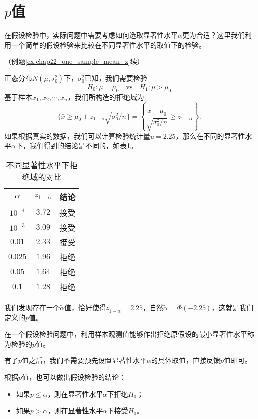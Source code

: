 \section{$p$值}
在假设检验中，实际问题中需要考虑如何选取显著性水平$\alpha$更为合适？这里我们利用一个简单的假设检验来比较在不同显著性水平的取值下的检验。

\begin{example}{（例题\ref{ex:chap22_one_sample_mean_z}续）}

    正态分布$N(\mu,\sigma_0^2)$下，$\sigma_0^2$已知，我们需要检验$$
    H_0: \mu = \mu_0 \quad \text{vs} \quad H_1: \mu > \mu_0
    $$
    基于样本$x_1,x_2,\cdots,x_n$，我们所构造的拒绝域为
    $$
    \{ \bar{x} \geq \mu_0 + z_{1-\alpha} \sqrt{\sigma_0^2/n} \} = \left\{ \frac{\bar{x} - \mu_0}{\sqrt{\sigma_0^2/n}} \geq z_{1-\alpha}\right\}.
    $$
    如果根据真实的数据，我们可以计算检验统计量$u = 2.25 $，那么在不同的显著性水平$\alpha$下，我们得到的结论是不同的，如表\ref{tab:lect22_3}。
    \begin{table}[ht]
        \centering
        \caption{不同显著性水平下拒绝域的对比}\label{tab:lect22_3}
        \begin{tabular}{ccc}
        \hline
            $\alpha$ & $z_{1-\alpha}$ & 结论\\
             \hline
            $10^{-4}$ & $3.72$ & 接受\\
             $10^{-3}$ & $3.09$ & 接受\\
              $0.01$ & $2.33$ & 接受\\
               $0.025$ & $1.96$ & 拒绝\\
                $0.05$ & $1.64$ & 拒绝\\
                 $0.1$ & $1.28$ & 拒绝\\
             \hline
        \end{tabular}
    \end{table}
\end{example}
我们发现存在一个$\tilde{\alpha}$值，恰好使得$z_{1-\tilde{\alpha}} = 2.25$，自然$\tilde{\alpha} = \Phi(-2.25)$，这就是我们定义的$p$值。

\begin{definition}
    在一个假设检验问题中，利用样本观测值能够作出拒绝原假设的最小显著性水平称为检验的$p$值。
\end{definition}
\begin{remark}
    有了$p$值之后，我们不需要预先设置显著性水平$\alpha$的具体取值，直接反馈$p$值即可。
\end{remark}
根据$p$值，也可以做出假设检验的结论：
\begin{itemize}
    \item 如果$p \leq \alpha$，则在显著性水平$\alpha$下拒绝$H_0$；
    \item 如果$p>\alpha$，则在显著性水平$\alpha$下接受$H_0$。
\end{itemize}


